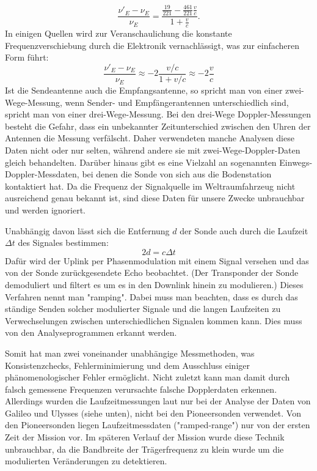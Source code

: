 \begin{equation}\label{equ:rel}
 \frac{\nu'_E-\nu_E}{\nu_E} = \frac{\frac{19}{221}- \frac{461}{221}\frac{v}{c}}{1+\frac{v}{c}}.
\end{equation}
In einigen Quellen wird zur Veranschaulichung die konstante Frequenzverschiebung durch die Elektronik
vernachlässigt, was zur einfacheren Form führt:
\begin{equation}\label{equ:einf_rel}
 \frac{\nu'_E-\nu_E}{\nu_E} \approx -2\frac{v/c}{1+v/c} \approx -2 \frac{v}{c}
\end{equation}
Ist die Sendeantenne auch die Empfangsantenne, so spricht man von einer zwei-Wege-Messung, wenn Sender- und Empfängerantennen unterschiedlich sind, spricht man von einer drei-Wege-Messung\cite{Levy2009}. Bei den drei-Wege Doppler-Messungen besteht die Gefahr, dass ein unbekannter Zeitunterschied zwischen den Uhren der Antennen die Messung verfälscht. Daher verwendeten manche Analysen diese Daten nicht oder nur selten\cite{Anderson2002}, während andere sie mit zwei-Wege-Doppler-Daten gleich behandelten\cite{Markwardt2002}. Darüber hinaus gibt es eine Vielzahl an sogenannten Einwegs-Doppler-Messdaten, bei denen die Sonde von sich aus die Bodenstation kontaktiert hat. Da die Frequenz der Signalquelle im Weltraumfahrzeug nicht ausreichend genau bekannt ist, sind diese Daten für unsere Zwecke unbrauchbar und werden ignoriert.

Unabhängig davon lässt sich die Entfernung $d$ der Sonde auch durch die Laufzeit $\Delta t$ des Signales bestimmen:
\begin{equation}
 2d = c \Delta t
\end{equation}
Dafür wird der Uplink per Phasenmodulation mit einem Signal versehen und das von der Sonde zurückgesendete Echo beobachtet. (Der Transponder der Sonde demoduliert und filtert es um es in den Downlink hinein zu modulieren.) Dieses Verfahren nennt man "ramping".
Dabei muss man beachten, dass es durch das ständige Senden solcher modulierter Signale und die langen Laufzeiten zu Verwechselungen zwischen unterschiedlichen Signalen kommen kann. Dies muss von den Analyseprogrammen erkannt werden.

Somit hat man zwei voneinander unabhängige Messmethoden, was Konsistenzchecks,
Fehlerminimierung und dem Ausschluss einiger phänomenologischer Fehler ermöglicht. Nicht zuletzt kann man damit durch falsch gemessene Frequenzen verursachte falsche Dopplerdaten erkennen\cite{Anderson2002}.
Allerdings wurden die Laufzeitmessungen laut \cite{Anderson2002} nur bei der Analyse der Daten von Galileo und Ulysses (siehe unten), nicht bei den Pioneersonden verwendet. Von den Pioneersonden liegen Laufzeitmessdaten ("ramped-range") nur von der ersten Zeit der Mission vor. Im späteren Verlauf der Mission wurde diese Technik unbrauchbar, da die Bandbreite der Trägerfrequenz zu klein wurde um die modulierten Veränderungen zu detektieren\cite{Turyshev2010}. %

